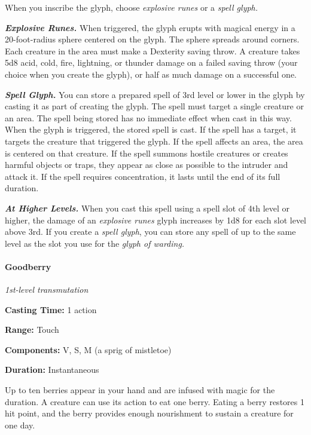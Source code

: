 \documentclass[
]{article}
\begin{document}
When you inscribe the glyph, choose \emph{explosive runes} or a
\emph{spell glyph.}

\emph{\textbf{Explosive Runes.}} When triggered, the glyph erupts with
magical energy in a 20-foot-radius sphere centered on the glyph. The
sphere spreads around corners. Each creature in the area must make a
Dexterity saving throw. A creature takes 5d8 acid, cold, fire,
lightning, or thunder damage on a failed saving throw (your choice when
you create the glyph), or half as much damage on a successful one.

\emph{\textbf{Spell Glyph.}} You can store a prepared spell of 3rd level
or lower in the glyph by casting it as part of creating the glyph. The
spell must target a single creature or an area. The spell being stored
has no immediate effect when cast in this way. When the glyph is
triggered, the stored spell is cast. If the spell has a target, it
targets the creature that triggered the glyph. If the spell affects an
area, the area is centered on that creature. If the spell summons
hostile creatures or creates harmful objects or traps, they appear as
close as possible to the intruder and attack it. If the spell requires
concentration, it lasts until the end of its full duration.

\emph{\textbf{At Higher Levels.}} When you cast this spell using a spell
slot of 4th level or higher, the damage of an \emph{explosive runes}
glyph increases by 1d8 for each slot level above 3rd. If you create a
\emph{spell glyph}, you can store any spell of up to the same level as
the slot you use for the \emph{glyph of warding.}

\hypertarget{goodberry}{%
\paragraph{Goodberry}\label{goodberry}}

\emph{1st-level transmutation}

\textbf{Casting Time:} 1 action

\textbf{Range:} Touch

\textbf{Components:} V, S, M (a sprig of mistletoe)

\textbf{Duration:} Instantaneous

Up to ten berries appear in your hand and are infused with magic for the
duration. A creature can use its action to eat one berry. Eating a berry
restores 1 hit point, and the berry provides enough nourishment to
sustain a creature for one day.
\end{document}
